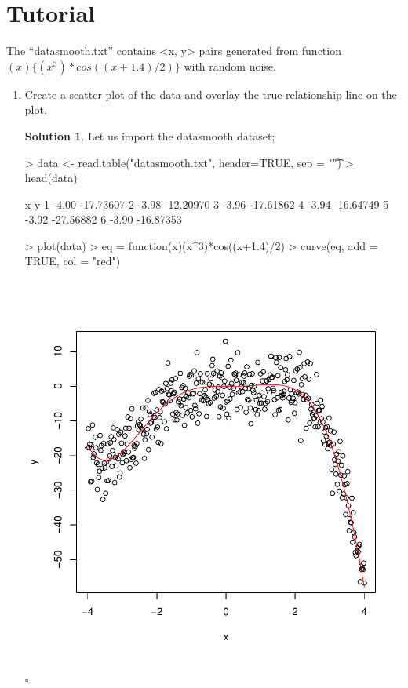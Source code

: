 \documentclass[twoside]{article}
\theoremstyle{definition}
\newtheorem*{solutionT}{Solution}
\newenvironment{solution}{\begin{cBox}\begin{solutionT}}{\hfill{\scriptsize\ensuremath{\square}}\end{solutionT}\end{cBox}}
\theoremstyle{definition}
\begin{document}
\section{Tutorial}
The “datasmooth.txt” contains <x, y> pairs generated from function$(x)\{(x^3) * cos((x+1.4)/2)\}$
with random noise.
\begin{enumerate}
\item Create a scatter plot of the data and overlay the true relationship line on the plot. 
\begin{solution}
Let us import the datasmooth dataset;

\begin{Schunk}
\begin{Sinput}
> data <- read.table("datasmooth.txt", header=TRUE, sep = "\t")
> head(data)
\end{Sinput}
\begin{Soutput}
      x         y
1 -4.00 -17.73607
2 -3.98 -12.20970
3 -3.96 -17.61862
4 -3.94 -16.64749
5 -3.92 -27.56882
6 -3.90 -16.87353
\end{Soutput}
\begin{Sinput}
> plot(data)
> eq = function(x){(x^3)*cos((x+1.4)/2)}
> curve(eq, add = TRUE, col = "red")
\end{Sinput}
\end{Schunk}
\includegraphics{week4-001}


\end{solution}
\end{enumerate}
\end{document}
